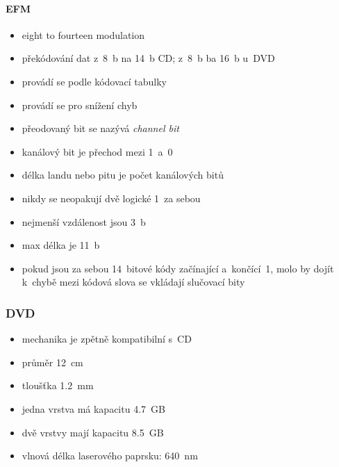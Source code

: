\documentclass[a4paper,12pt]{article}
\providecommand{\tightlist}{%
\setlength{\itemsep}{0pt}\setlength{\parskip}{0pt}}
\begin{document}
\paragraph{EFM}

\begin{itemize}
  \tightlist
  \item eight to fourteen modulation
  \item překódování dat z~8~b na 14~b CD; z~8~b ba 16~b u~DVD
  \item provádí se podle kódovací tabulky
  \item provádí se pro snížení chyb
  \item přeodovaný bit se nazývá \emph{channel bit}
  \item kanálový bit je přechod mezi 1~a~0
  \item délka landu nebo pitu je počet kanálových bitů
  \item nikdy se neopakují dvě logické 1~za sebou
  \item nejmenší vzdálenost jsou 3~b
  \item max délka je 11~b
  \item pokud jsou za sebou 14~bitové kódy začínající a~končící~1, molo by dojít
  k~chybě \textrightarrow{} mezi kódová slova se vkládají slučovací bity
\end{itemize}

\subsubsection{DVD}

\begin{itemize}
  \tightlist
  \item mechanika je zpětně kompatibilní s~CD
  \item průměr 12~cm
  \item tloušťka 1.2~mm
  \item jedna vrstva má kapacitu 4.7~GB
  \item dvě vrstvy mají kapacitu 8.5~GB
  \item vlnová délka laserového paprsku: 640~nm
\end{itemize}
\end{document}
